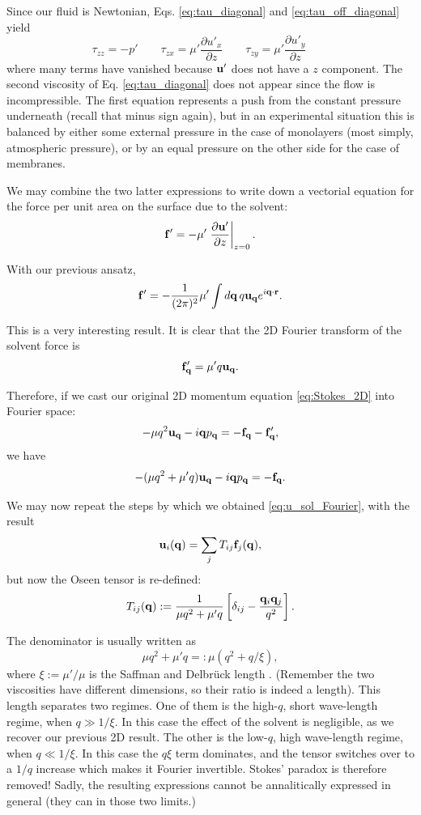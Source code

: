 Since our fluid is Newtonian, Eqs. \ref{eq:tau_diagonal} and
\ref{eq:tau_off_diagonal} yield
\begin{equation*}
  \tau_{zz} = -p'  \qquad
  \tau_{zx} = \mu' \frac{\partial u'_x}{\partial z}  \qquad
  \tau_{zy} = \mu' \frac{\partial u'_y}{\partial z}  \qquad
\end{equation*}
where many terms have vanished because $\mathbf{u}'$ does not have a $z$
component. The second viscosity of Eq. \ref{eq:tau_diagonal} does not
appear since the flow is incompressible. The first equation represents
a push from the constant pressure underneath (recall that minus sign
again), but in an experimental situation this is balanced by either
some external pressure in the case of monolayers (most simply,
atmospheric pressure), or by an equal pressure on the other side for
the case of membranes.

We may combine the two latter expressions to write down a vectorial
equation for the force per unit area on the surface due to the
solvent:
\[
  \mathbf{f}' = - \mu' \left. \frac{\partial \mathbf{u}'}{\partial z} \right|_{z=0} .
\]


With our previous ansatz,
\[
  \mathbf{f}' = - \frac 1{(2\pi)^2} \mu' \int d\mathbf{q} \, q \mathbf{u}_{\mathbf{q}} e^{
    i\mathbf{q}\cdot\mathbf{r}} .
\]

This is a very interesting result. It is clear that the 2D Fourier
transform of the solvent force is
\[
  \mathbf{f}'_{\mathbf{q}} =  \mu' q \mathbf{u}_{\mathbf{q}} .
\]

Therefore, if we cast our original 2D momentum equation
\ref{eq:Stokes_2D} into Fourier space:
\[
-  \mu q^2 \mathbf{u}_{\mathbf{q}} - i \mathbf{q} p_{\mathbf{q}} = -\mathbf{f}_{\mathbf{q}} -\mathbf{f}'_{\mathbf{q}} ,
\]
we have
\[
-  ( \mu q^2 +  \mu' q ) \mathbf{u}_{\mathbf{q}} - i \mathbf{q} p_{\mathbf{q}} = -\mathbf{f}_{\mathbf{q}} .
\]

We may now repeat the steps by which we obtained
\ref{eq:u_sol_Fourier}, with the result
\begin{equation*}
\mathbf{u}_i(\mathbf{q}) =  \sum_j T_{ij} \mathbf{f}_j(\mathbf{q}),
\end{equation*}
%
but now the Oseen tensor is re-defined:
\[
T_{ij}(\mathbf{q}) := \frac 1{\mu q^2 +  \mu' q  } \left[
  \delta_{ij} - \frac{ \mathbf{q}_i  \mathbf{q}_j}{q^2} 
\right].
\]

The denominator is usually written as
\[
  \mu q^2 +  \mu' q =:
  \mu (q^2 +  q / \xi ) ,
\]
where $\xi:= \mu'/\mu$ is the Saffman and Delbr{\"u}ck length
. (Remember the two
viscosities have different dimensions, so their ratio is indeed a
length). This length separates two regimes.  One of them is the
high-$q$, short wave-length regime, when $q \gg 1/\xi$. In this case
the effect of the solvent is negligible, as we recover our previous 2D
result. The other is the low-$q$, high wave-length regime, when
$q \ll 1/\xi$. In this case the $q\xi$ term dominates, and the tensor
switches over to a $1/q$ increase which makes it Fourier
invertible. Stokes' paradox is therefore removed! Sadly, the resulting
expressions cannot be annalitically expressed in general (they can in
those two limits.)

